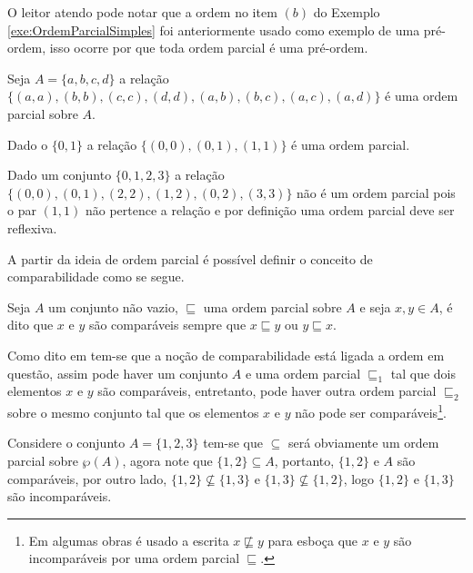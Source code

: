 \begin{remark}
	O leitor atendo pode notar que a ordem no item $(b)$ do Exemplo \ref{exe:OrdemParcialSimples} foi anteriormente usado como exemplo de uma pré-ordem, isso ocorre por que toda ordem parcial é uma pré-ordem.
\end{remark}

\begin{example}
	Seja $A = \{a, b, c, d\}$ a relação $\{(a, a), (b, b), (c, c), (d, d), (a, b), (b, c), (a, c), (a, d)\}$ é uma ordem parcial sobre $A$.
\end{example}

\begin{example}
	Dado o $\{0,1\}$ a relação $\{(0,0), (0, 1), (1, 1)\}$ é uma ordem parcial.
\end{example}

\begin{example}
	Dado um conjunto $\{0, 1, 2, 3\}$ a relação $\{(0, 0), (0, 1), (2, 2), (1, 2), (0, 2), (3, 3)\}$ não é um ordem parcial pois o par $(1, 1)$ não pertence a relação e por definição uma ordem parcial deve ser reflexiva.
\end{example}

A partir da ideia de ordem parcial é possível definir o conceito de comparabilidade como se segue.

\begin{definition}[Comparabilidade]\label{def:Comparabilidade}
	Seja $A$ um conjunto não vazio, $\sqsubseteq$ uma ordem parcial sobre $A$ e seja $x, y \in A$, é dito que $x$ e $y$ são comparáveis sempre que $x \sqsubseteq y$ ou $y \sqsubseteq x$.
\end{definition}

Como dito em \cite{abe1991-TC, carmo2013} tem-se que a noção de comparabilidade está ligada a ordem em questão, assim pode haver um conjunto $A$ e uma ordem parcial $\sqsubseteq_1$ tal que dois elementos $x$ e $y$ são comparáveis, entretanto, pode haver outra ordem parcial $\sqsubseteq_2$ sobre o mesmo conjunto tal que os elementos $x$ e $y$ não pode ser comparáveis\footnote{Em algumas obras é usado a escrita $x \not\sqsubseteq y$ para esboça que $x$ e $y$ são incomparáveis por uma ordem parcial $\sqsubseteq$.}.

\begin{example}
	Considere o conjunto $A = \{1, 2, 3\}$ tem-se que $\subseteq$ será obviamente um ordem parcial sobre $\wp(A)$, agora note que $\{1, 2\} \subseteq A$, portanto, $\{1, 2\}$ e $A$ são comparáveis, por outro lado, $\{1, 2\} \not\subseteq \{1, 3\}$ e $\{1, 3\} \not\subseteq \{1, 2\}$, logo $\{1, 2\}$ e $\{1, 3\}$ são incomparáveis.
\end{example}

